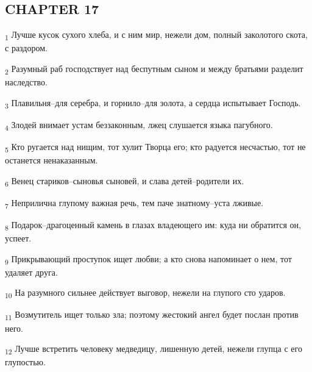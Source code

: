 \subsection{CHAPTER 17}
\begin{tcolorbox}
\textsubscript{1} Лучше кусок сухого хлеба, и с ним мир, нежели дом, полный заколотого скота, с раздором.
\end{tcolorbox}
\begin{tcolorbox}
\textsubscript{2} Разумный раб господствует над беспутным сыном и между братьями разделит наследство.
\end{tcolorbox}
\begin{tcolorbox}
\textsubscript{3} Плавильня--для серебра, и горнило--для золота, а сердца испытывает Господь.
\end{tcolorbox}
\begin{tcolorbox}
\textsubscript{4} Злодей внимает устам беззаконным, лжец слушается языка пагубного.
\end{tcolorbox}
\begin{tcolorbox}
\textsubscript{5} Кто ругается над нищим, тот хулит Творца его; кто радуется несчастью, тот не останется ненаказанным.
\end{tcolorbox}
\begin{tcolorbox}
\textsubscript{6} Венец стариков--сыновья сыновей, и слава детей--родители их.
\end{tcolorbox}
\begin{tcolorbox}
\textsubscript{7} Неприлична глупому важная речь, тем паче знатному--уста лживые.
\end{tcolorbox}
\begin{tcolorbox}
\textsubscript{8} Подарок--драгоценный камень в глазах владеющего им: куда ни обратится он, успеет.
\end{tcolorbox}
\begin{tcolorbox}
\textsubscript{9} Прикрывающий проступок ищет любви; а кто снова напоминает о нем, тот удаляет друга.
\end{tcolorbox}
\begin{tcolorbox}
\textsubscript{10} На разумного сильнее действует выговор, нежели на глупого сто ударов.
\end{tcolorbox}
\begin{tcolorbox}
\textsubscript{11} Возмутитель ищет только зла; поэтому жестокий ангел будет послан против него.
\end{tcolorbox}
\begin{tcolorbox}
\textsubscript{12} Лучше встретить человеку медведицу, лишенную детей, нежели глупца с его глупостью.
\end{tcolorbox}
